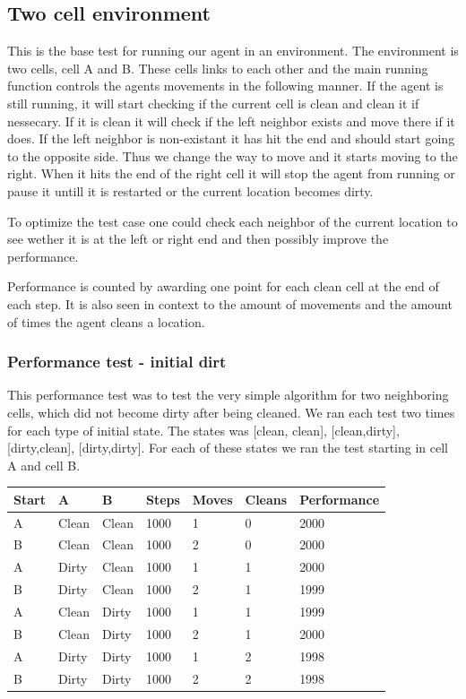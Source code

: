 \subsection{Two cell environment}
This is the base test for running our agent in an environment.  The environment
is two cells, cell A and B. These cells links to each other and the main running
function controls the agents movements in the following manner. If the agent is
still running, it will start checking if the current cell is clean and clean it
if nessecary.  If it is clean it will check if the left neighbor exists and move
there if it does.  If the left neighbor is non-existant it has hit the end and
should start going to the opposite side. Thus we change the way to move and it
starts moving to the right. When it hits the end of the right cell it will stop
the agent from running or pause it untill it is restarted or the current
location becomes dirty.

To optimize the test case one could check each neighbor of the current location
to see wether it is at the left or right end and then possibly improve the
performance.

Performance is counted by awarding one point for each clean cell at the end of
each step.  It is also seen in context to the amount of movements and the amount
of times the agent cleans a location.

\subsubsection{Performance test - initial dirt}
This performance test was to test the very simple algorithm for two neighboring
cells, which did not become dirty after being cleaned.  We ran each test two
times for each type of initial state. The states was [clean, clean],
[clean,dirty], [dirty,clean], [dirty,dirty].  For each of these states we ran
the test starting in cell A and cell B.

\begin{longtable}{p{} p{} p{} 
									p{} p{} p{} 
									p{}}
Start	& A & B & Steps & Moves & Cleans & Performance \\\hline
A & Clean & Clean & 1000 & 1 & 0 & 2000 \\
B & Clean & Clean & 1000 & 2 & 0 & 2000 \\
A & Dirty & Clean & 1000 & 1 & 1 & 2000 \\
B & Dirty & Clean & 1000 & 2 & 1 & 1999 \\
A & Clean & Dirty & 1000 & 1 & 1 & 1999 \\
B & Clean & Dirty & 1000 & 2 & 1 & 2000 \\
A & Dirty & Dirty & 1000 & 1 & 2 & 1998 \\
B & Dirty & Dirty & 1000 & 2 & 2 & 1998 \\
\end{longtable}



